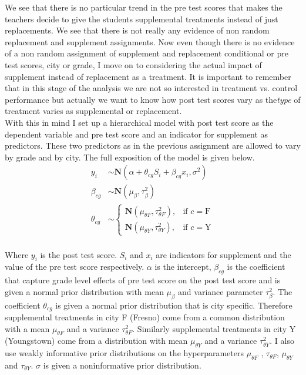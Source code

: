 \documentclass{article}
\begin{document}
We see that there is no particular trend in the pre test scores that makes the teachers decide to give the students supplemental treatments instead of just replacements. We see that there is not really any evidence of non random replacement and supplement assignments. Now even though there is no evidence of a non random assignment of supplement and replacement conditional or pre test scores, city or grade, I move on to considering the actual impact of supplement instead of replacement as a treatment. It is important to remember that in this stage of the analysis we are not so interested in treatment vs. control performance but actually we want to know how post test scores vary as the\emph{type} of treatment varies as supplemental or replacement.\\ 
With this in mind I set up a hierarchical model with post test score as the dependent variable and pre test score and an indicator for supplement as predictors. These two predictors as in the previous assignment are allowed to vary by grade and by city. The full exposition of the model is given below.\\
\begin{align*}
y_i &\sim \textbf{N}(\alpha + \theta_{cg} S_i + \beta_{cg} x_i, \sigma^2)\\
\beta_{cg} &\sim \textbf{N}(\mu_\beta, \tau_{\beta}^2)\\
\theta_{cg} &\sim
\begin{cases}
   \textbf{N}(\mu_{\theta F}, \tau_{\theta F}^2) ,& \text{if } c = \text{F}\\
     \textbf{N}(\mu_{\theta Y}, \tau_{\theta Y}^2) ,& \text{if } c = \text{Y}
\end{cases}
\end{align*}\\
Where $y_i$ is the post test score. $S_i$ and $x_i$ are indicators for supplement and the value of the pre test score respectively. $\alpha$ is the intercept, $\beta_{cg}$ is the coefficient that capture grade level effects of pre test score on the post test score and is given a normal prior distribution with mean $\mu_\beta$ and variance parameter $\tau_\beta^2$. The coefficient $\theta_{cg}$ is given a normal prior distribution that is city specific. Therefore supplemental treatments in city F (Fresno) come from a common distribution with a mean $\mu_{\theta F}$ and a variance $\tau_{\theta F}^2$. Similarly supplemental treatments in city Y (Youngstown) come from a distribution with mean $\mu_{\theta Y}$ and a variance $\tau_{\theta Y}^2$. I also use weakly informative prior distributions on the hyperparameters $\mu_{\theta F}$ , $\tau_{\theta F}$, $\mu_{\theta Y}$ and $\tau_{\theta Y}$. $\sigma$ is given a noninformative prior distribution.\\
\end{document}
